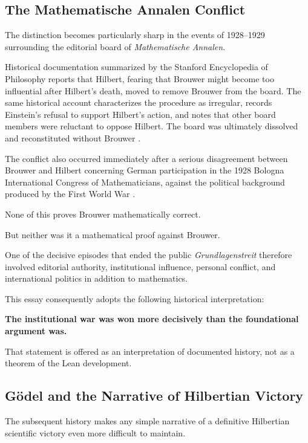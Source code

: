 \documentclass[11pt,a4paper]{article}
\begin{document}
\subsection{The Mathematische Annalen Conflict}

The distinction becomes particularly sharp in the events of 1928--1929
surrounding the editorial board of \emph{Mathematische Annalen}.

Historical documentation summarized by the Stanford Encyclopedia of
Philosophy reports that Hilbert, fearing that Brouwer might become too
influential after Hilbert's death, moved to remove Brouwer from the
board. The same historical account characterizes the procedure as
irregular, records Einstein's refusal to support Hilbert's action, and
notes that other board members were reluctant to oppose Hilbert.
The board was ultimately dissolved and reconstituted without Brouwer
\cite{SEPBrouwer}.

The conflict also occurred immediately after a serious disagreement
between Brouwer and Hilbert concerning German participation in the 1928
Bologna International Congress of Mathematicians, against the political
background produced by the First World War
\cite{SEPBrouwer}.

None of this proves Brouwer mathematically correct.

But neither was it a mathematical proof against Brouwer.

One of the decisive episodes that ended the public
\emph{Grundlagenstreit} therefore involved editorial authority,
institutional influence, personal conflict, and international politics
in addition to mathematics.

This essay consequently adopts the following historical interpretation:

\begin{center}
\textbf{The institutional war was won more decisively than the
foundational argument was.}
\end{center}

That statement is offered as an interpretation of documented history,
not as a theorem of the Lean development.

\subsection{Gödel and the Narrative of Hilbertian Victory}

The subsequent history makes any simple narrative of a definitive
Hilbertian scientific victory even more difficult to maintain.
\end{document}
